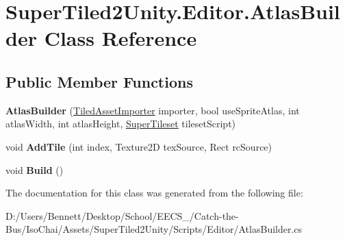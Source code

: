 \hypertarget{class_super_tiled2_unity_1_1_editor_1_1_atlas_builder}{}\section{Super\+Tiled2\+Unity.\+Editor.\+Atlas\+Builder Class Reference}
\label{class_super_tiled2_unity_1_1_editor_1_1_atlas_builder}
\subsection*{Public Member Functions}
\begin{DoxyCompactItemize}
\item 
\mbox{\label{class_super_tiled2_unity_1_1_editor_1_1_atlas_builder_a90fd4dcc5c666accb2ec3459cc88e908}} 
{\bfseries Atlas\+Builder} (\mbox{\hyperlink{class_super_tiled2_unity_1_1_editor_1_1_tiled_asset_importer}{Tiled\+Asset\+Importer}} importer, bool use\+Sprite\+Atlas, int atlas\+Width, int atlas\+Height, \mbox{\hyperlink{class_super_tiled2_unity_1_1_editor_1_1_super_tileset}{Super\+Tileset}} tileset\+Script)
\item 
\mbox{\label{class_super_tiled2_unity_1_1_editor_1_1_atlas_builder_a61718b08f686b14e669858ce4855be00}} 
void {\bfseries Add\+Tile} (int index, Texture2D tex\+Source, Rect rc\+Source)
\item 
\mbox{\label{class_super_tiled2_unity_1_1_editor_1_1_atlas_builder_ae69375577fa11fb5a6afb7cb82c4133a}} 
void {\bfseries Build} ()
\end{DoxyCompactItemize}


The documentation for this class was generated from the following file\+:\begin{DoxyCompactItemize}
\item 
D\+:/\+Users/\+Bennett/\+Desktop/\+School/\+E\+E\+C\+S\+\_/\+Catch-\/the-\/\+Bus/\+Iso\+Chai/\+Assets/\+Super\+Tiled2\+Unity/\+Scripts/\+Editor/Atlas\+Builder.\+cs\end{DoxyCompactItemize}
